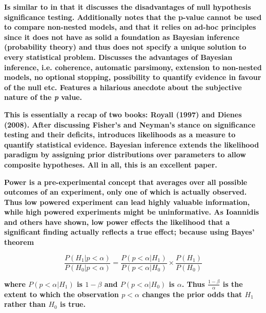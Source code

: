\documentclass[12pt]{scrartcl}
\begin{document}
\begin{description}
  \textbf{Is similar to \cite{wagenmakers2007practical} in that it discusses the disadvantages of null hypothesis significance testing. Additionally notes that the p-value cannot be used to compare non-nested models, and that it relies on ad-hoc principles since it does not have as solid a foundation as Bayesian inference (probability theory) and thus does not specify a unique solution to every statistical problem. Discusses the advantages of Bayesian inference, i.e. coherence, automatic parsimony, extension to non-nested models, no optional stopping, possibility to quantify evidence in favour of the null etc. Features a hilarious anecdote about the subjective nature of the \emph{p} value.}
  
  \item {}
  
  \textbf{This is essentially a recap of two books: Royall (1997) and Dienes (2008). After discussing Fisher's and Neyman's stance on significance testing and their deficits, introduces likelihoods as a measure to quantify statistical evidence. Bayesian inference extends the likelihood paradigm by assigning prior distributions over parameters to allow composite hypotheses. All in all, this is an excellent paper.}
  
  \item {}
  \item {}
  \item {}
  \item {}
  \item {}
  
  \textbf{Power is a pre-experimental concept that averages over all possible outcomes of an experiment, only one of which is actually observed. Thus low powered experiment can lead highly valuable information, while high powered experiments might be uninformative. As Ioannidis \cite{ioannidis2005most} and others \cite{button2013power} have shown, low power effects the likelihood that a significant finding actually reflects a true effect; because using Bayes' theorem}
  
  \begin{equation*}
    \frac{P(H_1 | p < \alpha)}{P(H_0 | p < \alpha)} = \frac{P(p < \alpha | H_1)}{P(p < \alpha | H_0)} \times \frac{P(H_1)}{P(H_0)}
  \end{equation*}
  
  \textbf{where $P(p < \alpha | H_1)$ is $1 - \beta$ and $P(p < \alpha | H_0)$ is $\alpha$. Thus $\frac{1 - \beta}{\alpha}$ is the extent to which the observation $p < \alpha$ changes the prior odds that $H_1$ rather than $H_0$ is true.}
  

\end{description}
\end{document}
